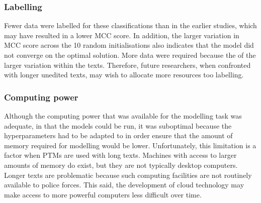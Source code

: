 \subsubsection{Labelling} Fewer data were labelled for these classifications than in the earlier studies, which may have resulted in a lower MCC score. In addition, the larger variation in MCC score across the 10 random initialisations also indicates that the model did not converge on the optimal solution. More data were required because the of the larger variation within the texts. Therefore, future researchers, when confronted with longer unedited texts, may wish to allocate more resources too labelling.

\subsubsection{Computing power}Although the computing power that was available for the modelling task was adequate, in that the models could be run, it was suboptimal because the hyperparameters had to be adapted to in order ensure that the amount of memory required for modelling would be lower. Unfortunately, this limitation is a factor when PTMs are used with long texts. Machines with access to larger amounts of memory do exist, but they are not typically desktop computers. Longer texts are problematic because such computing facilities are not routinely available to police forces. This said, the development of cloud technology may make access to more powerful computers less difficult over time.

 
